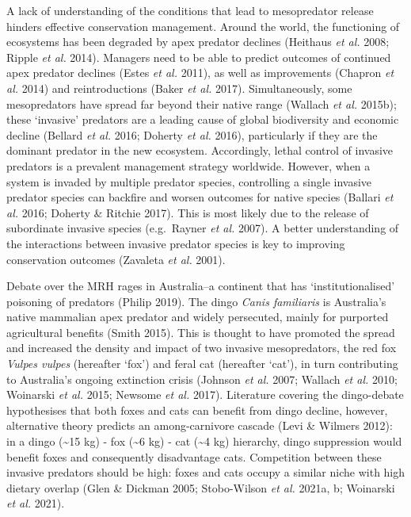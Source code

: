\documentclass[11pt,a4paper,titlepage,twoside,openright]{style/unimelbthesis}
\begin{document}
\begin{mainmatter}
A lack of understanding of the conditions that lead to mesopredator release hinders effective conservation management. Around the world, the functioning of ecosystems has been degraded by apex predator declines (Heithaus \emph{et al.} 2008; Ripple \emph{et al.} 2014). Managers need to be able to predict outcomes of continued apex predator declines (Estes \emph{et al.} 2011), as well as improvements (Chapron \emph{et al.} 2014) and reintroductions (Baker \emph{et al.} 2017). Simultaneously, some mesopredators have spread far beyond their native range (Wallach \emph{et al.} 2015b); these `invasive' predators are a leading cause of global biodiversity and economic decline (Bellard \emph{et al.} 2016; Doherty \emph{et al.} 2016), particularly if they are the dominant predator in the new ecosystem. Accordingly, lethal control of invasive predators is a prevalent management strategy worldwide. However, when a system is invaded by multiple predator species, controlling a single invasive predator species can backfire and worsen outcomes for native species (Ballari \emph{et al.} 2016; Doherty \& Ritchie 2017). This is most likely due to the release of subordinate invasive species (e.g.~Rayner \emph{et al.} 2007). A better understanding of the interactions between invasive predator species is key to improving conservation outcomes (Zavaleta \emph{et al.} 2001).

Debate over the MRH rages in Australia--a continent that has `institutionalised' poisoning of predators (Philip 2019). The dingo \emph{Canis familiaris} is Australia's native mammalian apex predator and widely persecuted, mainly for purported agricultural benefits (Smith 2015). This is thought to have promoted the spread and increased the density and impact of two invasive mesopredators, the red fox \emph{Vulpes vulpes} (hereafter `fox') and feral cat (hereafter `cat'), in turn contributing to Australia's ongoing extinction crisis (Johnson \emph{et al.} 2007; Wallach \emph{et al.} 2010; Woinarski \emph{et al.} 2015; Newsome \emph{et al.} 2017). Literature covering the dingo-debate hypothesises that both foxes and cats can benefit from dingo decline, however, alternative theory predicts an among-carnivore cascade (Levi \& Wilmers 2012): in a dingo (\textasciitilde15 kg) - fox (\textasciitilde6 kg) - cat (\textasciitilde4 kg) hierarchy, dingo suppression would benefit foxes and consequently disadvantage cats. Competition between these invasive predators should be high: foxes and cats occupy a similar niche with high dietary overlap (Glen \& Dickman 2005; Stobo-Wilson \emph{et al.} 2021a, b; Woinarski \emph{et al.} 2021).


\end{mainmatter}
\end{document}

